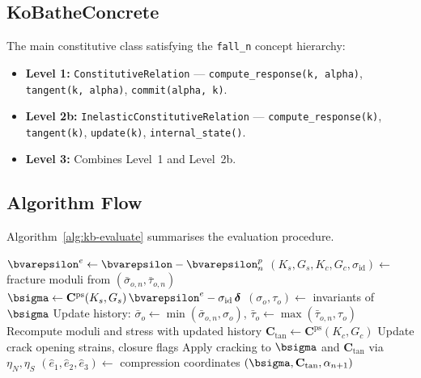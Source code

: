 \subsection{KoBatheConcrete}
\label{ssec:kb-main-class}

The main constitutive class satisfying the \texttt{fall\_n} concept hierarchy:

\begin{itemize}
  \item \textbf{Level 1:} \texttt{ConstitutiveRelation}
    --- \texttt{compute\_response(k, alpha)}, \texttt{tangent(k, alpha)},
        \texttt{commit(alpha, k)}.
  \item \textbf{Level 2b:} \texttt{InelasticConstitutiveRelation}
    --- \texttt{compute\_response(k)}, \texttt{tangent(k)}, \texttt{update(k)},
        \texttt{internal\_state()}.
  \item \textbf{Level 3:} Combines Level~1 and Level~2b.
\end{itemize}

\subsection{Algorithm Flow}
\label{ssec:kb-algorithm}

Algorithm~\ref{alg:kb-evaluate} summarises the evaluation procedure.

\begin{algorithm}[htb]
\SetAlgoLined
{}
$\bvarepsilon^e \leftarrow \bvarepsilon - \bvarepsilon^p_n$ 
$(K_s, G_s, K_c, G_c, \sigma_{\text{id}}) \leftarrow$ fracture moduli from $(\bar\sigma_{o,n}, \bar\tau_{o,n})$\;
$\bsigma \leftarrow \mathbf{C}^{\text{ps}}(K_s, G_s)\,\bvarepsilon^e - \sigma_{\text{id}}\,\boldsymbol{\delta}$ 
$(\sigma_o, \tau_o) \leftarrow$ invariants of $\bsigma$ 
Update history: $\bar\sigma_o \leftarrow \min(\bar\sigma_{o,n},\sigma_o)$,
  $\bar\tau_o \leftarrow \max(\bar\tau_{o,n},\tau_o)$\;
Recompute moduli and stress with updated history\;
$\mathbf{C}_{\text{tan}} \leftarrow \mathbf{C}^{\text{ps}}(K_c, G_c)$\;
Update crack opening strains, closure flags\;
Apply cracking to $\bsigma$ and $\mathbf{C}_{\text{tan}}$ via $\eta_N, \eta_S$\;
$(\hat{e}_1,\hat{e}_2,\hat{e}_3) \leftarrow$ compression coordinates\;
\Return $(\bsigma, \mathbf{C}_{\text{tan}}, \alpha_{n+1})$\;
\caption{Ko--Bathe constitutive evaluation.}
\label{alg:kb-evaluate}
\end{algorithm}

